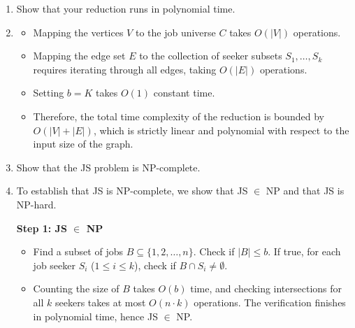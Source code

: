 \documentclass[12pt,a4paper]{article}
\makeatletter
\newtheorem*{solution}{Solution}
\theoremstyle{definition}
\renewenvironment{solution}[1][Solution] {\par\pushQED{\qed}\normalfont\topsep6\p@\@plus6\p@\relax\trivlist\item[\hskip\labelsep\bfseries#1\@addpunct{.}]\ignorespaces}{\popQED\endtrivlist\@endpefalse} \makeatother
\makeatother
\begin{document}
\begin{enumerate}
\begin{enumerate}
        \item Show that your reduction runs in polynomial time.
        
        \begin{solution}
        \begin{itemize}
            \item Mapping the vertices $V$ to the job universe $C$ takes $O(|V|)$ operations.
            \item Mapping the edge set $E$ to the collection of seeker subsets $S_1, \dots, S_k$ requires iterating through all edges, taking $O(|E|)$ operations.
            \item Setting $b = K$ takes $O(1)$ constant time.
            \item Therefore, the total time complexity of the reduction is bounded by $O(|V| + |E|)$, which is strictly linear and polynomial with respect to the input size of the graph.
        \end{itemize}
        \end{solution}

        \item Show that the JS problem is NP-complete.
        
        \begin{solution}
        To establish that JS is NP-complete, we show that JS $\in$ NP and that JS is NP-hard.
        
        \textbf{Step 1: JS $\in$ NP}
        \begin{itemize}
            \item Find a subset of jobs $B \subseteq \{1, 2, \dots, n\}$. Check if $|B| \le b$. If true, for each job seeker $S_i$ ($1 \le i \le k$), check if $B \cap S_i \neq \emptyset$. 
            \item Counting the size of $B$ takes $O(b)$ time, and checking intersections for all $k$ seekers takes at most $O(n \cdot k)$ operations. The verification finishes in polynomial time, hence JS $\in$ NP.
        \end{itemize}


\end{solution}
\end{enumerate}
\end{enumerate}
\end{document}
